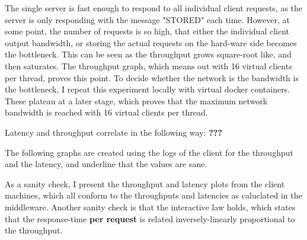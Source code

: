 \documentclass[11pt,a4paper]{article}
\begin{document}
The single server is fast enough to respond to all individual client requests, as the server is only responding with the message "STORED" each time.
However, at some point, the number of requests is so high, that either the individual client output bandwidth, or storing the actual requests on the hard-ware side becomes the bottleneck.
This can be seen as the throughput grows square-root like, and then saturates.
The throughput graph, which means out with 16 virtual clients per thread, proves this point.
To decide whether the network is the bandwidth is the bottleneck, I repeat this experiment locally with virtual docker containers.
These plateau at a later stage, which proves that the maximum network bandwidth is reached with 16 virtual clients per thread.

Latency and throughput correlate in the following way: \textbf{???}

The following graphs are created using the logs of the client for the throughput and the latency, and underline that the values are sane.

As a sanity check, I present the throughput and latency plots from the client machines, which all conform to the throughputs and latencies as caluclated in the middleware.
Another sanity check is that the interactive law holds, which states that the response-time \textbf{per request}  is related inversely-linearly proportional to the throughput.
\end{document}
